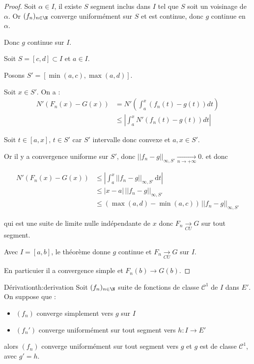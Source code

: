 \begin{proof}
    Soit $\alpha \in I$, il existe $S$ segment inclus dans $I$ tel que $S$ soit un voisinage de $\alpha$. Or 
    $(f_n)_{n \in \N}$ converge uniformément sur $S$ et est continue, donc $g$ continue en $\alpha$. 

    Donc $g$ continue sur $I$.

    \lvspace Soit $S = [c, d] \subset I$ et $a \in I$. 
    
    Posons $S' = [\min(a, c), \max(a, d)]$.

    Soit $x \in S'$. On a :
    \begin{align}
        N'(F_n(x) - G(x)) & = N'\left( \int_a^x (f_n(t) - g(t)) dt \right) \\
        & \leqslant \left| \int_{a}^x N'(f_n(t) - g(t)) dt \right|
    \end{align}

    Soit $t \in [a, x], \, t \in S'$ car $S'$ intervalle donc convexe et $a, x \in S'$. 

    Or il y a convergence uniforme sur $S'$, donc $||f_n - g||_{\infty, S'} \xrightarrow[n\to +\infty]{} 0$.
    et donc 

    \begin{equation*}
    \begin{aligned}
        N'(F_n(x) - G(x)) & \leqslant \left| \int_{a}^{x} ||f_n - g||_{\infty, S'} \,\mathrm{d}t \right| \\
        & \leqslant |x - a| \, ||f_n - g||_{\infty, S'} \\
        & \leqslant (\max(a, d) - \min(a, c)) \, ||f_n - g||_{\infty, S'}
    \end{aligned}
    \end{equation*}

    qui est une suite de limite nulle indépendante de $x$ donc $F_n \xrightarrow[CU]{} G$ sur tout segment. 


    \avspace Avec $I = [a, b]$, le théorème donne $g$ continue et $F_n \xrightarrow[CU]{} G$ sur $I$. 

    En particuier il a convergence simple et $F_n(b) \to G(b)$.
\end{proof}

\begin{theoreme}{Dérivation}{th:derivation}
    Soit $(f_n)_{n \in \N}$ suite de fonctions de classe $\mathscr{C}^1$ de $I$ dans $E'$.
    On suppose que : 
    \begin{itemize}
        \item $(f_n)$ converge simplement vers $g$ sur $I$
        \item $(f_n')$ converge uniformément sur tout segment vers $h : I \to E'$
    \end{itemize}

    alors $(f_n)$ converge uniformément sur tout segment vers $g$ et $g$ est de classe $\mathscr{C}^1$, 
    avec $g' = h$.
\end{theoreme}

